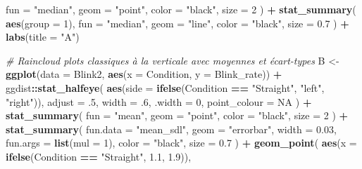 \documentclass[
  french,
]{book}
\newenvironment{Shaded}{\begin{snugshade}}{\end{snugshade}}
\newcommand{\CommentTok}[1]{\textcolor[rgb]{0.56,0.35,0.01}{\textit{#1}}}
\newcommand{\DataTypeTok}[1]{\textcolor[rgb]{0.13,0.29,0.53}{#1}}
\newcommand{\DecValTok}[1]{\textcolor[rgb]{0.00,0.00,0.81}{#1}}
\newcommand{\FloatTok}[1]{\textcolor[rgb]{0.00,0.00,0.81}{#1}}
\newcommand{\KeywordTok}[1]{\textcolor[rgb]{0.13,0.29,0.53}{\textbf{#1}}}
\newcommand{\NormalTok}[1]{#1}
\newcommand{\OperatorTok}[1]{\textcolor[rgb]{0.81,0.36,0.00}{\textbf{#1}}}
\newcommand{\OtherTok}[1]{\textcolor[rgb]{0.56,0.35,0.01}{#1}}
\newcommand{\StringTok}[1]{\textcolor[rgb]{0.31,0.60,0.02}{#1}}
\begin{document}
\begin{Shaded}
\begin{Highlighting}[]
    \DataTypeTok{fun =} \StringTok{"median"}\NormalTok{,}
    \DataTypeTok{geom =} \StringTok{"point"}\NormalTok{,}
    \DataTypeTok{color =} \StringTok{"black"}\NormalTok{,}
    \DataTypeTok{size =} \DecValTok{2}
\NormalTok{  ) }\OperatorTok{+}
\StringTok{  }\KeywordTok{stat_summary}\NormalTok{(}
    \KeywordTok{aes}\NormalTok{(}\DataTypeTok{group =} \DecValTok{1}\NormalTok{),}
    \DataTypeTok{fun =} \StringTok{"median"}\NormalTok{,}
    \DataTypeTok{geom =} \StringTok{"line"}\NormalTok{,}
    \DataTypeTok{color =} \StringTok{"black"}\NormalTok{,}
    \DataTypeTok{size =} \FloatTok{0.7}
\NormalTok{  ) }\OperatorTok{+}
\StringTok{  }\KeywordTok{labs}\NormalTok{(}\DataTypeTok{title =} \StringTok{"A"}\NormalTok{)}


\CommentTok{# Raincloud plots classiques à la verticale avec moyennes et écart-types}
\NormalTok{B <-}
\StringTok{  }\KeywordTok{ggplot}\NormalTok{(}\DataTypeTok{data =}\NormalTok{ Blink2, }\KeywordTok{aes}\NormalTok{(}\DataTypeTok{x =}\NormalTok{ Condition, }\DataTypeTok{y =}\NormalTok{ Blink_rate)) }\OperatorTok{+}
\StringTok{  }\NormalTok{ggdist}\OperatorTok{::}\KeywordTok{stat_halfeye}\NormalTok{(}
    \KeywordTok{aes}\NormalTok{(}\DataTypeTok{side =} \KeywordTok{ifelse}\NormalTok{(Condition }\OperatorTok{==}\StringTok{ "Straight"}\NormalTok{, }\StringTok{"left"}\NormalTok{, }\StringTok{"right"}\NormalTok{)),}
    \DataTypeTok{adjust =} \FloatTok{.5}\NormalTok{, }
    \DataTypeTok{width =} \FloatTok{.6}\NormalTok{, }
    \DataTypeTok{.width =} \DecValTok{0}\NormalTok{, }
    \DataTypeTok{point_colour =} \OtherTok{NA}
\NormalTok{    ) }\OperatorTok{+}
\StringTok{  }\KeywordTok{stat_summary}\NormalTok{(}
    \DataTypeTok{fun =} \StringTok{"mean"}\NormalTok{,}
    \DataTypeTok{geom =} \StringTok{"point"}\NormalTok{,}
    \DataTypeTok{color =} \StringTok{"black"}\NormalTok{,}
    \DataTypeTok{size =} \DecValTok{2}
\NormalTok{  ) }\OperatorTok{+}
\StringTok{  }\KeywordTok{stat_summary}\NormalTok{(}
    \DataTypeTok{fun.data  =} \StringTok{"mean_sdl"}\NormalTok{,}
    \DataTypeTok{geom =} \StringTok{"errorbar"}\NormalTok{,}
    \DataTypeTok{width =} \FloatTok{0.03}\NormalTok{,}
    \DataTypeTok{fun.args =} \KeywordTok{list}\NormalTok{(}\DataTypeTok{mul =} \DecValTok{1}\NormalTok{),}
    \DataTypeTok{color =} \StringTok{"black"}\NormalTok{, }
    \DataTypeTok{size =} \FloatTok{0.7}
\NormalTok{  ) }\OperatorTok{+}
\StringTok{  }\KeywordTok{geom_point}\NormalTok{(}
    \KeywordTok{aes}\NormalTok{(}\DataTypeTok{x =} \KeywordTok{ifelse}\NormalTok{(Condition }\OperatorTok{==}\StringTok{ "Straight"}\NormalTok{, }\FloatTok{1.1}\NormalTok{, }\FloatTok{1.9}\NormalTok{)),}

\end{Highlighting}
\end{Shaded}
\end{document}
